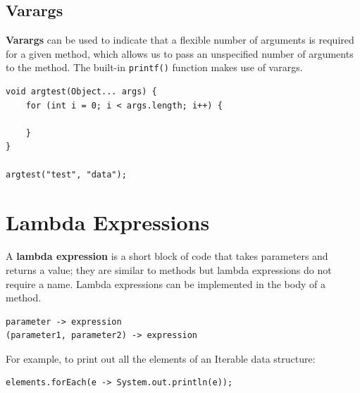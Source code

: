\documentclass[a4paper,11pt]{article}
\begin{document}
\subsection{Varargs}
\textbf{Varargs} can be used to indicate that a flexible number of arguments is required for a given method, which allows 
us to pass an unspecified number of arguments to the method. The built-in \verb|printf()| function makes use of varargs.
\begin{verbatim}
void argtest(Object... args) {
    for (int i = 0; i < args.length; i++) {

    }
}

argtest("test", "data");
\end{verbatim}


\section{Lambda Expressions}
A \textbf{lambda expression} is a short block of code that takes parameters and returns a value; they are similar to methods 
but lambda expressions do not require a name. 
Lambda expressions can be implemented in the body of a method.
\begin{verbatim}
parameter -> expression 
(parameter1, parameter2) -> expression
\end{verbatim}

For example, to print out all the elements of an Iterable data structure:
\begin{verbatim}
elements.forEach(e -> System.out.println(e));
\end{verbatim}
\end{document}
